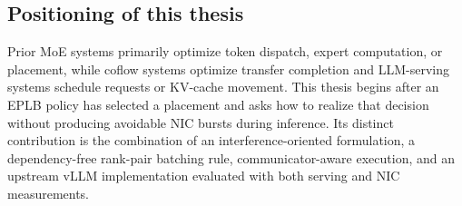 \subsection{Positioning of this thesis}

Prior MoE systems primarily optimize token dispatch, expert computation, or
placement, while coflow systems optimize transfer completion and LLM-serving
systems schedule requests or KV-cache movement. This thesis begins after an
EPLB policy has selected a placement and asks how to realize that decision
without producing avoidable NIC bursts during inference. Its distinct
contribution is the combination of an interference-oriented formulation, a
dependency-free rank-pair batching rule, communicator-aware execution, and an
upstream vLLM implementation evaluated with both serving and NIC measurements.
